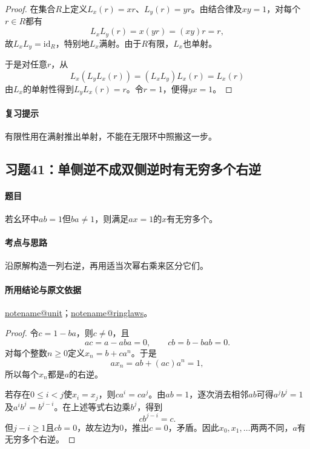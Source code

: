 \documentclass[UTF8,a4paper,11pt,fontset=windows]{ctexart}
\makeatletter
\newcommand{\noteref}[1]{\hyperref[note:#1]{\csname notename@#1\endcsname}}
\newcommand{\exref}[2]{\hyperref[ex:#1:#2]{第#1章习题#2}}
\makeatother
\begin{document}

\begin{proof}
在集合$R$上定义$L_x(r)=xr$、$L_y(r)=yr$。由结合律及$xy=1$，对每个$r\in R$都有
\[
L_xL_y(r)=x(yr)=(xy)r=r,
\]
故$L_xL_y=\mathrm{id}_R$，特别地$L_x$满射。由于$R$有限，$L_x$也单射。

于是对任意$r$，从
\[
L_x(L_yL_x(r))=(L_xL_y)L_x(r)=L_x(r)
\]
由$L_x$的单射性得到$L_yL_x(r)=r$。令$r=1$，便得$yx=1$。
\end{proof}

\paragraph{复习提示}
有限性用在满射推出单射，不能在无限环中照搬这一步。


\subsection{习题41：\texorpdfstring{单侧逆不成双侧逆时有无穷多个右逆}{单侧逆不成双侧逆时有无穷多个右逆}}
\label{ex:1:41}

\paragraph{题目}
若幺环中$ab=1$但$ba\neq1$，则满足$ax=1$的$x$有无穷多个。

\paragraph{考点与思路}
沿原解构造一列右逆，再用适当次幂右乘来区分它们。

\paragraph{所用结论与原文依据}
\noteref{unit}；\noteref{ringlaws}。


\begin{proof}
令$c=1-ba$，则$c\ne0$，且
\[
ac=a-aba=0,\qquad cb=b-bab=0.
\]
对每个整数$n\geq0$定义$x_n=b+ca^n$。于是
\[
ax_n=ab+(ac)a^n=1,
\]
所以每个$x_n$都是$a$的右逆。

若存在$0\leq i<j$使$x_i=x_j$，则$ca^i=ca^j$。由$ab=1$，逐次消去相邻$ab$可得$a^jb^j=1$及$a^ib^j=b^{j-i}$。在上述等式右边乘$b^j$，得到
\[
cb^{j-i}=c.
\]
但$j-i\geq1$且$cb=0$，故左边为0，推出$c=0$，矛盾。因此$x_0,x_1,\ldots$两两不同，$a$有无穷多个右逆。
\end{proof}
\end{document}
